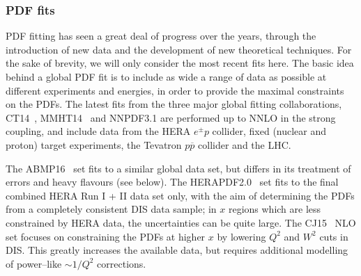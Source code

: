


\subsubsection*{PDF fits}

PDF fitting has seen a great deal of progress over the years, through the introduction of new data and the development of new theoretical techniques. For the sake of brevity, we will only consider the most recent fits here. The basic idea behind a global PDF fit is to include as wide a range of data as possible at different experiments and energies, in order to provide the maximal constraints on the PDFs. The latest fits from the three major global fitting collaborations, CT14~\cite{Dulat:2015mca}, MMHT14~\cite{Harland-Lang:2014zoa} and NNPDF3.1 are performed up to NNLO in the strong coupling, and include data from the HERA $e^{\pm} p$ collider, fixed (nuclear and proton) target experiments, the Tevatron $p\overline{p}$ collider and the LHC. 

The ABMP16~\cite{Alekhin:2017kpj} set fits to a similar global data set, but differs in its treatment of errors and heavy flavours (see below). The HERAPDF2.0~\cite{Abramowicz:2015mha} set fits to the final combined HERA Run I + II data set only, with the aim of determining the PDFs from a completely consistent DIS data sample; in $x$ regions which are less constrained by HERA data, the uncertainties can be quite large. The CJ15~\cite{Accardi:2016qay} NLO set focuses on constraining the PDFs at higher $x$ by lowering $Q^2$ and $W^2$ cuts in DIS. This greatly increases the available data, but requires additional modelling of power--like $\sim 1/Q^2$ corrections.


